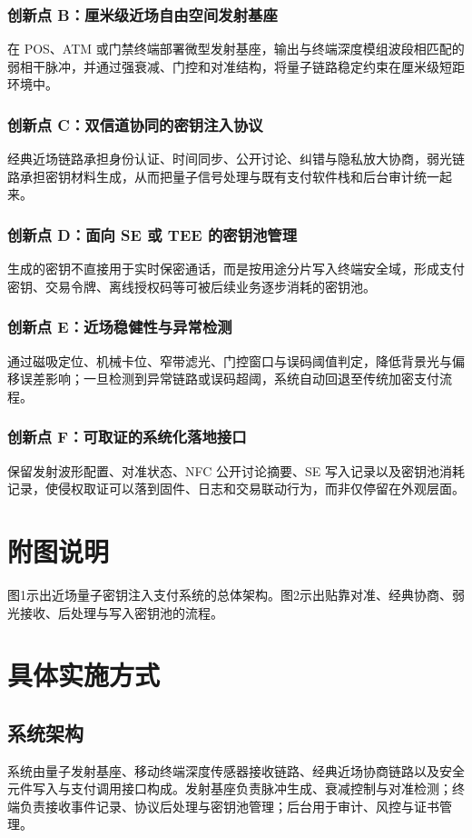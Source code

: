 ﻿\documentclass[12pt,a4paper]{article}
\begin{document}
\subsubsection{创新点 B：厘米级近场自由空间发射基座}
在 POS、ATM 或门禁终端部署微型发射基座，输出与终端深度模组波段相匹配的弱相干脉冲，并通过强衰减、门控和对准结构，将量子链路稳定约束在厘米级短距环境中。

\subsubsection{创新点 C：双信道协同的密钥注入协议}
经典近场链路承担身份认证、时间同步、公开讨论、纠错与隐私放大协商，弱光链路承担密钥材料生成，从而把量子信号处理与既有支付软件栈和后台审计统一起来。

\subsubsection{创新点 D：面向 SE 或 TEE 的密钥池管理}
生成的密钥不直接用于实时保密通话，而是按用途分片写入终端安全域，形成支付密钥、交易令牌、离线授权码等可被后续业务逐步消耗的密钥池。

\subsubsection{创新点 E：近场稳健性与异常检测}
通过磁吸定位、机械卡位、窄带滤光、门控窗口与误码阈值判定，降低背景光与偏移误差影响；一旦检测到异常链路或误码超阈，系统自动回退至传统加密支付流程。

\subsubsection{创新点 F：可取证的系统化落地接口}
保留发射波形配置、对准状态、NFC 公开讨论摘要、SE 写入记录以及密钥池消耗记录，使侵权取证可以落到固件、日志和交易联动行为，而非仅停留在外观层面。

\section{附图说明}
图1示出近场量子密钥注入支付系统的总体架构。图2示出贴靠对准、经典协商、弱光接收、后处理与写入密钥池的流程。

\section{具体实施方式}
\subsection{系统架构}
系统由量子发射基座、移动终端深度传感器接收链路、经典近场协商链路以及安全元件写入与支付调用接口构成。发射基座负责脉冲生成、衰减控制与对准检测；终端负责接收事件记录、协议后处理与密钥池管理；后台用于审计、风控与证书管理。
\end{document}
